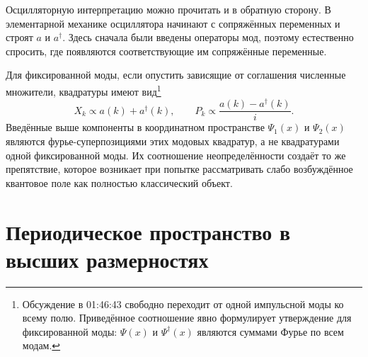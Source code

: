 Осцилляторную интерпретацию можно прочитать и в обратную сторону. В элементарной механике осциллятора начинают с сопряжённых переменных и строят \(a\) и \(a^\dagger\). Здесь сначала были введены операторы мод, поэтому естественно спросить, где появляются соответствующие им сопряжённые переменные.

\begin{classroomqa}
\end{classroomqa}

Для фиксированной моды, если опустить зависящие от соглашения численные множители, квадратуры имеют вид\footnote{Обсуждение в 01:46:43 свободно переходит от одной импульсной моды ко всему полю. Приведённое соотношение явно формулирует утверждение для фиксированной моды: \(\Psi(x)\) и \(\Psi^\dagger(x)\) являются суммами Фурье по всем модам.}
\begin{equation}
X_k\propto a(k)+a^\dagger(k),
\qquad
P_k\propto \frac{a(k)-a^\dagger(k)}{i}.
\end{equation}
Введённые выше компоненты в координатном пространстве \(\Psi_1(x)\) и \(\Psi_2(x)\) являются фурье-суперпозициями этих модовых квадратур, а не квадратурами одной фиксированной моды. Их соотношение неопределённости создаёт то же препятствие, которое возникает при попытке рассматривать слабо возбуждённое квантовое поле как полностью классический объект.

\section{Периодическое пространство в высших размерностях}

\begin{classroomqa}
\end{classroomqa}

